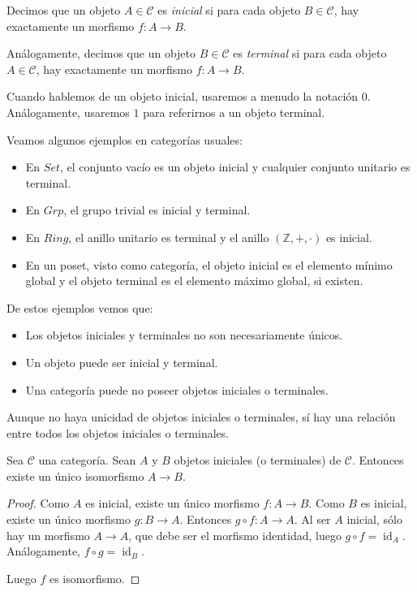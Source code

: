 \documentclass[12pt, twoside]{book}
\newcommand{\newterm}[1]{\index{#1}\emph{#1}}
\newcommand{\cat}{{\mathcal{C}}}
\newcommand{\Set}{{Set}}
\newcommand{\Grp}{{Grp}}
\newcommand{\Ring}{{Ring}}
\newcommand{\Z}{{\mathbb{Z}}}
\DeclareMathOperator{\id}{id}
\begin{document}
\begin{definition}
Decimos que un objeto $A \in \cat$ es \newterm{inicial} si para cada objeto $B \in \cat$, hay exactamente un morfismo $f \colon A \to B$.

Análogamente, decimos que un objeto $B \in \cat$ es \newterm{terminal} si para cada objeto $A \in \cat$, hay exactamente un morfismo $f \colon A \to B$.
\end{definition}

Cuando hablemos de un objeto inicial, usaremos a menudo la notación $0$.
Análogamente, usaremos $1$ para referirnos a un objeto terminal.

\begin{example}
Veamos algunos ejemplos en categorías usuales:
\begin{itemize}
  \item En $\Set$, el conjunto vacío es un objeto inicial y cualquier conjunto unitario es terminal.
  \item En $\Grp$, el grupo trivial es inicial y terminal.
  \item En $\Ring$, el anillo unitario es terminal y el anillo $(\Z,+,\cdot)$ es inicial.
  \item En un poset, visto como categoría, el objeto inicial es el elemento mínimo global y el objeto terminal es el elemento máximo global, si existen.
\end{itemize}
\end{example}

De estos ejemplos vemos que:
\begin{itemize}
  \item Los objetos iniciales y terminales no son necesariamente únicos.
  \item Un objeto puede ser inicial y terminal.
  \item Una categoría puede no poseer objetos iniciales o terminales.
\end{itemize}

Aunque no haya unicidad de objetos iniciales o terminales, sí hay una relación entre todos los objetos iniciales o terminales.
\begin{proposition}
Sea $\cat$ una categoría. Sean $A$ y $B$ objetos iniciales (o terminales) de $\cat$.
Entonces existe un único isomorfismo $A \to B$.
\end{proposition}
\begin{proof}
Como $A$ es inicial, existe un único morfismo $f \colon A \to B$.
Como $B$ es inicial, existe un único morfismo $g \colon B \to A$.
Entonces $g \circ f \colon A \to A$.
Al ser $A$ inicial, sólo hay un morfismo $A \to A$, que debe ser el morfismo identidad, luego $g \circ f = \id_A$.
Análogamente, $f \circ g = \id_B$.

Luego $f$ es isomorfismo.
\end{proof}
\end{document}
